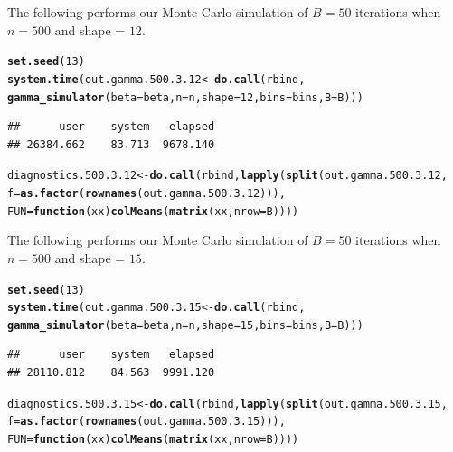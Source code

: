 \documentclass[11pt]{article}\usepackage[]{graphicx}\usepackage[]{color}
\makeatletter
\newcommand{\hlnum}[1]{\textcolor[rgb]{0.686,0.059,0.569}{#1}}%
\newcommand{\hlstd}[1]{\textcolor[rgb]{0.345,0.345,0.345}{#1}}%
\newcommand{\hlkwa}[1]{\textcolor[rgb]{0.161,0.373,0.58}{\textbf{#1}}}%
\newcommand{\hlkwb}[1]{\textcolor[rgb]{0.69,0.353,0.396}{#1}}%
\newcommand{\hlkwc}[1]{\textcolor[rgb]{0.333,0.667,0.333}{#1}}%
\newcommand{\hlkwd}[1]{\textcolor[rgb]{0.737,0.353,0.396}{\textbf{#1}}}%
\newenvironment{kframe}{%
 \def\at@end@of@kframe{}%
 \ifinner\ifhmode%
  \def\at@end@of@kframe{\end{minipage}}%
  \begin{minipage}{\columnwidth}%
 \fi\fi%
 \def\FrameCommand##1{\hskip\@totalleftmargin \hskip-\fboxsep
 \colorbox{shadecolor}{##1}\hskip-\fboxsep
     \hskip-\linewidth \hskip-\@totalleftmargin \hskip\columnwidth}%
 \MakeFramed {\advance\hsize-\width
   \@totalleftmargin\z@ \linewidth\hsize
   \@setminipage}}%
 {\par\unskip\endMakeFramed%
 \at@end@of@kframe}
\newenvironment{knitrout}{}{} %
\makeatother
\begin{document}
The following performs our Monte Carlo simulation of $B = 50$ iterations 
when $n = 500$ and shape = $12$.

\begin{knitrout}
\color{fgcolor}\begin{kframe}
\begin{alltt}
\hlkwd{set.seed}\hlstd{(}\hlnum{13}\hlstd{)}
\hlkwd{system.time}\hlstd{(out.gamma.500.3.12} \hlkwb{<-} \hlkwd{do.call}\hlstd{(rbind,}
  \hlkwd{gamma_simulator}\hlstd{(}\hlkwc{beta} \hlstd{= beta,} \hlkwc{n} \hlstd{= n,} \hlkwc{shape} \hlstd{=} \hlnum{12}\hlstd{,} \hlkwc{bins} \hlstd{= bins,} \hlkwc{B} \hlstd{= B)))}
\end{alltt}
\begin{verbatim}
##      user    system   elapsed 
## 26384.662    83.713  9678.140
\end{verbatim}
\begin{alltt}
\hlstd{diagnostics.500.3.12} \hlkwb{<-} \hlkwd{do.call}\hlstd{(rbind,} \hlkwd{lapply}\hlstd{(}\hlkwd{split}\hlstd{(out.gamma.500.3.12,}
  \hlkwc{f} \hlstd{=} \hlkwd{as.factor}\hlstd{(}\hlkwd{rownames}\hlstd{(out.gamma.500.3.12))),}
  \hlkwc{FUN} \hlstd{=} \hlkwa{function}\hlstd{(}\hlkwc{xx}\hlstd{)} \hlkwd{colMeans}\hlstd{(}\hlkwd{matrix}\hlstd{(xx,} \hlkwc{nrow} \hlstd{= B))))}
\end{alltt}
\end{kframe}
\end{knitrout}


The following performs our Monte Carlo simulation of $B = 50$ iterations 
when $n = 500$ and shape = $15$.

\begin{knitrout}
\color{fgcolor}\begin{kframe}
\begin{alltt}
\hlkwd{set.seed}\hlstd{(}\hlnum{13}\hlstd{)}
\hlkwd{system.time}\hlstd{(out.gamma.500.3.15} \hlkwb{<-} \hlkwd{do.call}\hlstd{(rbind,}
  \hlkwd{gamma_simulator}\hlstd{(}\hlkwc{beta} \hlstd{= beta,} \hlkwc{n} \hlstd{= n,} \hlkwc{shape} \hlstd{=} \hlnum{15}\hlstd{,} \hlkwc{bins} \hlstd{= bins,} \hlkwc{B} \hlstd{= B)))}
\end{alltt}
\begin{verbatim}
##      user    system   elapsed 
## 28110.812    84.563  9991.120
\end{verbatim}
\begin{alltt}
\hlstd{diagnostics.500.3.15} \hlkwb{<-} \hlkwd{do.call}\hlstd{(rbind,} \hlkwd{lapply}\hlstd{(}\hlkwd{split}\hlstd{(out.gamma.500.3.15,}
  \hlkwc{f} \hlstd{=} \hlkwd{as.factor}\hlstd{(}\hlkwd{rownames}\hlstd{(out.gamma.500.3.15))),}
  \hlkwc{FUN} \hlstd{=} \hlkwa{function}\hlstd{(}\hlkwc{xx}\hlstd{)} \hlkwd{colMeans}\hlstd{(}\hlkwd{matrix}\hlstd{(xx,} \hlkwc{nrow} \hlstd{= B))))}
\end{alltt}
\end{kframe}
\end{knitrout}
\end{document}
